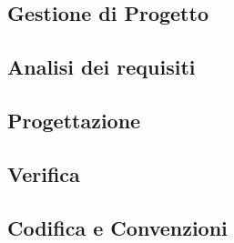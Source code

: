 \subsection{Gestione di Progetto}


\subsection{Analisi dei requisiti}


\newpage
\subsection{Progettazione}


\subsection{Verifica}


\subsection{Codifica e Convenzioni}


